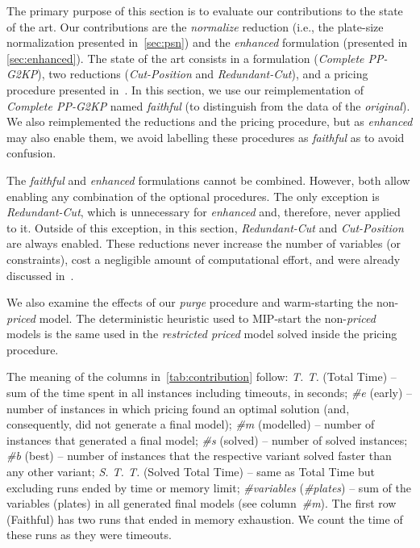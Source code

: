 \documentclass[ppgc,tese,english,formais,babel]{iiufrgs}
\begin{document}
The primary purpose of this section is to evaluate our contributions to the state of the art.
Our contributions are the \emph{normalize} reduction (i.e., the plate-size normalization presented in~\cref{sec:psn}) and the \emph{enhanced} formulation (presented in \cref{sec:enhanced}).
The state of the art consists in a formulation (\emph{Complete PP-G2KP}), two reductions (\emph{Cut-Position} and \emph{Redundant-Cut}), and a pricing procedure presented in~\citet{furini:2016,dimitri_thesis}.
In this section, we use our reimplementation of \emph{Complete PP-G2KP} named \emph{faithful} (to distinguish from the data of the \emph{original}).
We also reimplemented the reductions and the pricing procedure, but as \emph{enhanced} may also enable them, we avoid labelling these procedures as \emph{faithful} as to avoid confusion.

The \emph{faithful} and \emph{enhanced} formulations cannot be combined.
However, both allow enabling any combination of the optional procedures.
The only exception is \emph{Redundant-Cut}, which is unnecessary for \emph{enhanced} and, therefore, never applied to it.
Outside of this exception, in this section, \emph{Redundant-Cut} and \emph{Cut-Position} are always enabled.
These reductions never increase the number of variables (or constraints), cost a negligible amount of computational effort, and were already discussed in~\citet{furini:2016,dimitri_thesis}.

We also examine the effects of our \emph{purge} procedure and warm-starting the non-\emph{priced} model.
The deterministic heuristic used to MIP-start the non-\emph{priced} models is the same used in the \emph{restricted priced} model solved inside the pricing procedure.

The meaning of the columns in~\cref{tab:contribution} follow:
\emph{T. T.} (Total Time) -- sum of the time spent in all instances including timeouts, in seconds;
\emph{\#e} (early) -- number of instances in which pricing found an optimal solution (and, consequently, did not generate a final model);
\emph{\#m} (modelled) -- number of instances that generated a final model;
\emph{\#s} (solved) -- number of solved instances;
\emph{\#b} (best) -- number of instances that the respective variant solved faster than any other variant;
\emph{S. T. T.} (Solved Total Time) -- same as Total Time but excluding runs ended by time or memory limit;
\emph{\#variables} (\emph{\#plates}) -- sum of the variables (plates) in all generated final models (see column~\emph{\#m}).
The first row (Faithful) has two runs that ended in memory exhaustion.
We count the time of these runs as they were timeouts.
\end{document}
